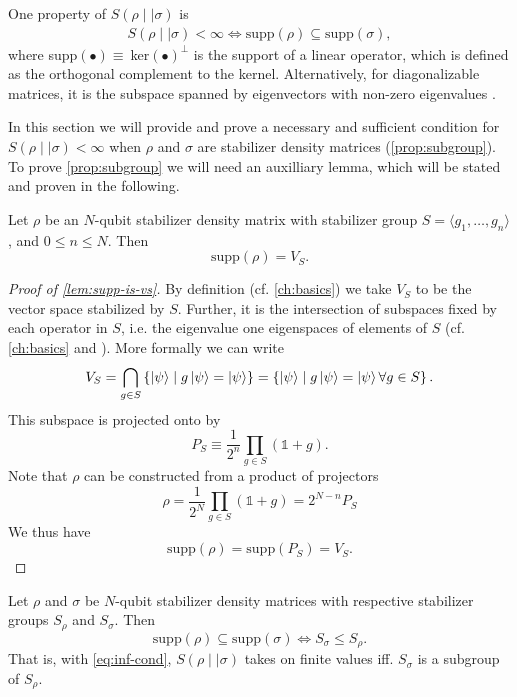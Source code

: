 One property of $S(\rho\mid\mid\sigma)$ is
\cite{leditzkyRelativeEntropiesTheir2016}
\begin{align}\label{eq:inf-cond}
  S(\rho\mid\mid\sigma) < \infty \Longleftrightarrow \mathrm{supp}(\rho) \subseteq
  \mathrm{supp}(\sigma)
,\end{align}
where supp$(\bullet)\equiv\ $ker$(\bullet)^\perp$ is the support of a linear
operator, which is defined as the orthogonal complement to the kernel.
Alternatively, for diagonalizable matrices, it is the subspace spanned by
eigenvectors with non-zero eigenvalues
\cite{schumacherRelativeEntropyQuantum2000}.

In this section we will provide and prove a necessary and sufficient condition
for $S(\rho\mid\mid\sigma)<\infty$ when $\rho$ and $\sigma$ are stabilizer
density matrices (\cref{prop:subgroup}). 
To prove \cref{prop:subgroup} we will need an auxilliary lemma, which will
be stated and proven in the following.
\begin{lem}\label{lem:supp-is-vs}
  Let $\rho$ be an $N$-qubit stabilizer density matrix with stabilizer group $S = \langle
  g_1, \ldots, g_n \rangle$, and $0\leq n \leq N$.
  Then \[ \mathrm{supp}(\rho) = V_{S}.\]
\end{lem}
\begin{proof}[Proof of \cref{lem:supp-is-vs}]
  By definition (cf. \cref{ch:basics}) we take $V_{S}$ to be the vector space
  stabilized by $S$.  Further, it is the intersection of subspaces fixed by
  each operator in $S$, i.e. the eigenvalue one eigenspaces of elements of $S$
  (cf.  \cref{ch:basics} and \cite{nielsenQuantumComputationQuantum2010}). More
  formally we can write
  \[ 
    V_S = \bigcap_{g \in S}  \left\{\ket{\psi} \mid g\ket{\psi} =
    \ket{\psi}\right\} = \left\{\ket{\psi} \mid g\ket{\psi} =
    \ket{\psi} \forall g \in S\right\}.
  \]
  This subspace is projected onto by
  \[ P_S \equiv \frac{1}{2^n} \prod_{g\in S} \left(\mathds{1} + g\right).\]
  Note that $\rho$ can be constructed from a product of projectors
  \cite{gottesmanStabilizerCodesQuantum1997}
  \[ \rho = \frac{1}{2^N} \prod_{g \in S} \left(\mathds{1} + g\right) = 2^{N-n} P_S \]
  We thus have
  \[ \mathrm{supp}(\rho) = \mathrm{supp}(P_S) = V_S. \]
\end{proof}

\begin{prop}\label{prop:subgroup}
  Let $\rho$ and $\sigma$ be $N$-qubit stabilizer density matrices with
  respective stabilizer groups $S_\rho$ and $S_\sigma$. Then
  \[ \mathrm{supp}(\rho)\subseteq \mathrm{supp}(\sigma) \Longleftrightarrow
  S_\sigma \leq S_\rho. \]
  That is, with \cref{eq:inf-cond}, $S(\rho\mid\mid\sigma)$ takes on finite values iff. $S_\sigma$ is a
  subgroup of $S_\rho$.
\end{prop}


